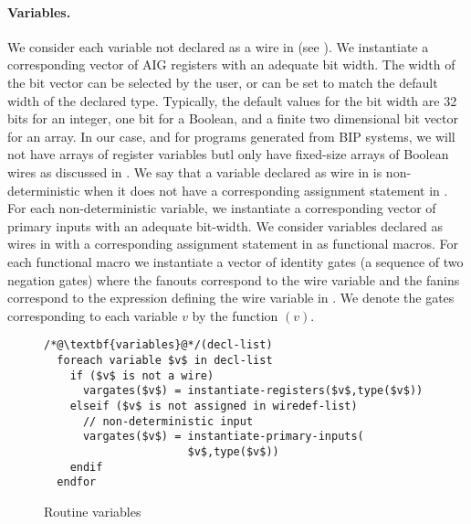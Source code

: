 \paragraph{Variables.} 
%
We consider each variable not declared as a wire 
in   (see ).
We instantiate a corresponding 
vector of AIG registers with an adequate bit width. 
The width of the bit vector can be selected by the user, 
or can be set to match the default width of the declared type. 
Typically, the default values for the bit width are 
32 bits for an integer, one bit for a Boolean, and a 
finite two dimensional bit vector for an array. 
In our case, and for \caig programs generated from BIP systems, 
we will not have arrays of register variables
butl only have fixed-size arrays of Boolean wires as 
discussed in .
%
We say that a variable declared as wire in 
is non-deterministic when it does not have a corresponding assignment statement in . 
For each non-deterministic variable, we instantiate a corresponding
vector of primary inputs with an adequate bit-width. 
%
We consider variables declared as wires in  with 
a corresponding assignment statement in  as functional macros. 
For each functional macro we 
instantiate a vector of identity gates (a sequence of two negation gates) 
where the fanouts correspond to the wire variable and the fanins correspond to
the expression defining the wire variable in . 
%
We denote the gates corresponding to each variable $v$ by the function $(v)$. 
%
\begin{figure}
\begin{lstlisting}
/*@\textbf{variables}@*/(decl-list)
  foreach variable $v$ in decl-list
    if ($v$ is not a wire) 
      vargates($v$) = instantiate-registers($v$,type($v$))
    elseif ($v$ is not assigned in wiredef-list) 
      // non-deterministic input
      vargates($v$) = instantiate-primary-inputs(
                      $v$,type($v$))
    endif
  endfor
\end{lstlisting}
\caption{Routine variables}
\label{fig:variables-listing}
\end{figure}
%
